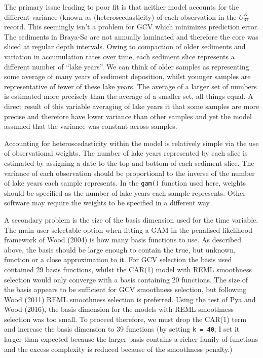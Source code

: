 \documentclass[12pt,]{article}
\newcommand{\uk}{\ensuremath{\mathit{U}^{\mathit{K}}_{\mathup{37}}}}
\begin{document}
The primary issue leading to poor fit is that neither model accounts for
the different variance (known as (heteroscedasticity) of each
observation in the \uk{} record. This seemingly isn't a problem for GCV
which minimizes prediction error. The sediments in Braya-Sø are not
annually laminated and therefore the core was sliced at regular depth
intervals. Owing to compaction of older sediments and variation in
accumulation rates over time, each sediment slice represents a different
number of ``lake years''. We can think of older samples as representing
some average of many years of sediment deposition, whilst younger
samples are representative of fewer of these lake years. The average of
a larger set of numbers is estimated more precisely than the average of
a smaller set, all things equal. A direct result of this variable
averaging of lake years it that some samples are more precise and
therefore have lower variance than other samples and yet the model
assumed that the variance was constant across samples.

Accounting for heteroscedasticity within the model is relatively simple
via the use of observational weights. The number of lake years
represented by each slice is estimated by assigning a date to the top
and bottom of each sediment slice. The variance of each observation
should be proportional to the inverse of the number of lake years each
sample represents. In the \texttt{gam()} function used here, weights
should be specified as the number of lake years each sample represents.
Other software may require the weights to be specified in a different
way.

A secondary problem is the size of the basis dimension used for the time
variable. The main user selectable option when fitting a GAM in the
penalised likelihood framework of Wood (2004) is how many basis
functions to use. As described above, the basis should be large enough
to contain the true, but unknown, function or a close approximation to
it. For GCV selection the basis used contained 29 basis functions,
whilst the CAR(1) model with REML smoothness selection would only
converge with a basis containing 20 functions. The size of the basis
appears to be sufficient for GCV smoothness selection, but following
Wood (2011) REML smoothness selection is preferred. Using the test of
Pya and Wood (2016), the basis dimension for the models with REML
smoothness selection was too small. To proceed therefore, we must drop
the CAR(1) term and increase the basis dimension to 39 functions (by
setting \texttt{k\ =\ 40}; I set it larger than expected because the
larger basis contains a richer family of functions and the excess
complexity is reduced because of the smoothness penalty.)
\end{document}
